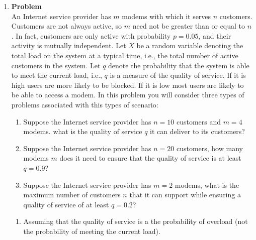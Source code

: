 \documentclass[12pt]{article}
\newenvironment{Ex}{\textbf{Problem}\vspace{.75em}\\}{}
\begin{document}
\begin{enumerate}
\begin{Ex}
\begin{solution}
\begin{equation}
          \label{eq:4-sol}
          E[g(X)] &= \sum 1 \\
          &= \infty \\
        \end{equation}
        The expected amount you would receive for guessing the correct
        coin toss number in infinite! Given unlimited resources, any
        amount of payment for this game would suffice.
      \end{solution}
    \end{Ex}
  \item
    \begin{Ex}
      An Internet service provider has $m$ modems with which it serves
      $n$ customers. Customers are not always active, so $m$ need not
      be greater than or equal to $n$. In fact, customers are only
      active with probability $p = 0.05$, and their activity is
      mutually independent. Let $X$ be a random variable denoting the
      total load on the system at a typical time, i.e., the total
      number of active customers in the system. Let $q$ denote the
      probability that the system is able to meet the current load,
      i.e., $q$ is a measure of the quality of service. If it is high
      users are more likely to be blocked. If it is low most users are
      likely to be able to access a modem. In this problem you will
      consider three types of problems associated with this types of
      scenario:
      \begin{enumerate}
      \item Suppose the Internet service provider has $n = 10$
        customers and $m = 4$ modems. what is the quality of service
        $q$ it can deliver to its customers?
      \item Suppose the Internet service provider has $n = 20$
        customers, how many modems $m$ does it need to ensure that the
        quality of service is at least $q = 0.9$?
      \item Suppose the Internet service provider has $m = 2$ modems,
        what is the maximum number of customers $n$ that it can support
        while ensuring a quality of service of at least $q = 0.2$?
      \end{enumerate}
      \begin{solution} \hfill
        \begin{enumerate}
        \item Assuming that the quality of service is a the
          probability of overload (not the probability of meeting the
          current load).


\end{enumerate}
\end{solution}
\end{Ex}
\end{enumerate}
\end{document}
